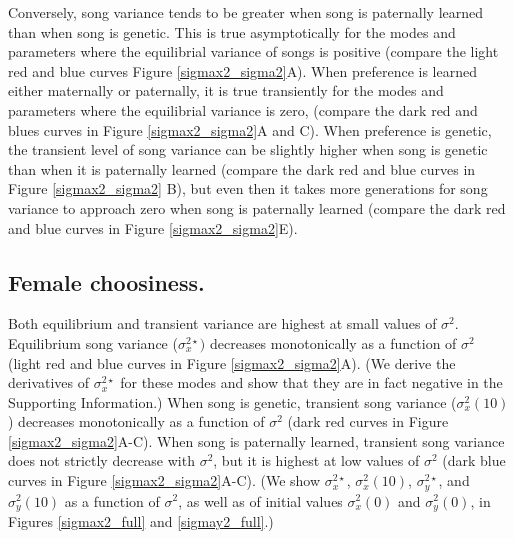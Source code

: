 \documentclass{article}
\begin{document}
Conversely, song variance tends to be greater when song is paternally learned than when song is genetic. This is true asymptotically for the modes and parameters where the equilibrial variance of songs is positive (compare the light red and blue curves Figure \ref{sigmax2_sigma2}A). When preference is learned either maternally or paternally, it is true transiently for the modes and parameters where the equilibrial variance is zero,  (compare the dark red and blues curves in Figure \ref{sigmax2_sigma2}A and C). When preference is genetic, the transient level of song variance can be slightly higher when song is genetic than when it is paternally learned (compare the dark red and blue curves in Figure \ref{sigmax2_sigma2} B), but even then it takes more generations for song variance to approach zero when song is paternally learned (compare the dark red and blue curves in Figure \ref{sigmax2_sigma2}E).



\subsection*{Female choosiness. }
Both equilibrium and transient variance are highest at small values of $\sigma^2$. Equilibrium song variance ($\sigma_x^{2\star})$ decreases monotonically as a function of $\sigma^2$ (light red and blue curves in Figure \ref{sigmax2_sigma2}A). (We derive the derivatives of $\sigma_x^{2\star}$ for these modes and show that they are in fact negative in the Supporting Information.) When song is genetic, transient song variance ($\sigma_x^2(10)$) decreases monotonically as a function of $\sigma^2$ (dark red curves in Figure \ref{sigmax2_sigma2}A-C). When song is paternally learned, transient song variance does not strictly decrease with $\sigma^2$, but it is highest at low values of $\sigma^2$ (dark blue curves in Figure \ref{sigmax2_sigma2}A-C).  (We show $\sigma_x^{2\star}$, $\sigma_x^2(10)$, $\sigma_y^{2\star}$, and $\sigma_y^2(10)$ as a function of $\sigma^2$, as well as of initial values $\sigma_x^2(0)$ and $\sigma_y^2(0)$, in Figures \ref{sigmax2_full} and \ref{sigmay2_full}.)
\end{document}
